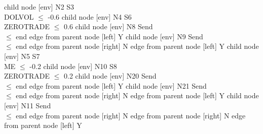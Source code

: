 
      child { node [env] {N2  S3 \\ DOLVOL $\leq$ -0.6} 
            child { node [env] {N4  S6 \\ ZEROTRADE $\leq$ 0.6} 
                  child { node [env] {N8  Send \\  $\leq$ end} 
                        edge from parent node [left] {Y} 
                  }
                  child { node [env] {N9  Send \\  $\leq$ end} 
                        edge from parent node [right] {N} 
                  }
                  edge from parent node [left] {Y} 
            }
            child { node [env] {N5  S7 \\ ME $\leq$ -0.2} 
                  child { node [env] {N10  S8 \\ ZEROTRADE $\leq$ 0.2} 
                        child { node [env] {N20  Send \\  $\leq$ end} 
                              edge from parent node [left] {Y} 
                        }
                        child { node [env] {N21  Send \\  $\leq$ end} 
                              edge from parent node [right] {N} 
                        }
                        edge from parent node [left] {Y} 
                  }
                  child { node [env] {N11  Send \\  $\leq$ end} 
                        edge from parent node [right] {N} 
                  }
                  edge from parent node [right] {N} 
            }
            edge from parent node [left] {Y} 
      }
